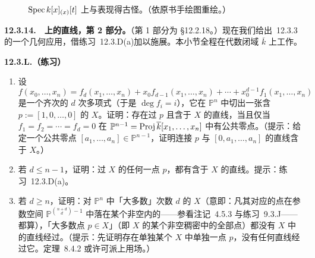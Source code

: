 \begin{figure}[htbp]
\centering
{}
\caption{\trSurface{} $\operatorname{Spec} k[x]_{(x)}[t]$ 上\trDimension{}与\trCodimension{}表现得古怪。（依原书手绘图重绘。）}\label{fig:codim-pathology}
\end{figure}

\textbf{12.3.14.}\ \hard\ \textbf{\trHypersurface{}上的直线，第 2 部分。}\quad （第 1 部分为 \S12.2.18。）现在我们给出\trKrull{}\trPrincipalIdealTheorem~12.3.3 的一个几何应用，借\mbox{练习~12.3.D(a)}加以施展。本小节全程在代数闭域 $\overline{k}$ 上工作。

\textbf{12.3.L.（练习）}
\begin{enumerate}[label=(\alph*)]
\item 设
\[
f(x_0,\dots,x_n)=f_d(x_1,\dots,x_n)+x_0f_{d-1}(x_1,\dots,x_n)+\cdots+x_0^{d-1}f_1(x_1,\dots,x_n)
\]
是一个齐次的 $d$ 次多项式（于是 $\deg f_i=i$），它在 $\mathbb{P}^n$ 中切出一张含 $p:=[1,0,\dots,0]$ 的\trHypersurface{} $X$。证明：存在过 $p$ 且含于 $X$ 的直线，当且仅当 $f_1=f_2=\cdots=f_d=0$ 在 $\mathbb{P}^{n-1}=\operatorname{Proj}\overline{k}[x_1,\dots,x_n]$ 中有公共零点。（提示：给定一个公共零点 $[a_1,\dots,a_n]\in\mathbb{P}^{n-1}$，证明连接 $p$ 与 $[0,a_1,\dots,a_n]$ 的直线含于 $X$。）
\item 若 $d\le n-1$，证明：过 $X$ 的任何一点 $p$，都有含于 $X$ 的直线。提示：\mbox{练习~12.3.D(a)}。
\item 若 $d\ge n$，证明：对 $\mathbb{P}^n$ 中「大多数」次数 $d$ 的\trHypersurface{} $X$（意即：凡其对应的点在参数空间 $\mathbb{P}^{\binom{n+d}{d}-1}$ 中落在某个非空\trZariski\trOpenSet{}内的\trHypersurface——参看注记~4.5.3 与\mbox{练习~9.3.J}——都算），「大多数点 $p\in X$」（即 $X$ 的某个非空稠密\trZariski\trOpenSet{}中的全部点）都没有 $X$ 中的直线经过。（提示：先证明存在单独某个 $X$ 中单独一点 $p$，没有任何直线经过它。\trChevalley{}定理~8.4.2 或许可派上用场。）
\end{enumerate}

